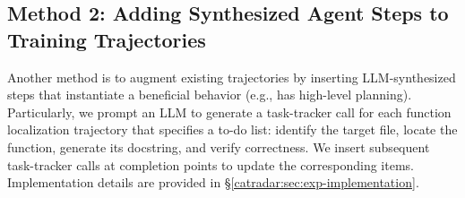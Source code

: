 \begin{table}[!t]
    \centering
    \caption{We can improve performance by adding synthetic task-planning steps in training trajectories. We highlight .}
    \label{catradar:tab:task-tracker-improvement}
\end{table}

\subsection{Method 2: Adding Synthesized Agent Steps to Training Trajectories}
\label{catradar:sec:synthetic-steps}

Another method is to augment existing trajectories by inserting LLM-synthesized steps that instantiate a beneficial behavior (e.g., has high-level planning).
Particularly, we prompt an LLM to generate a task-tracker call for each function localization trajectory that specifies a to-do list: identify the target file, locate the function, generate its docstring, and verify correctness.
We insert subsequent task-tracker calls at completion points to update the corresponding items.
Implementation details are provided in \S\ref{catradar:sec:exp-implementation}.

